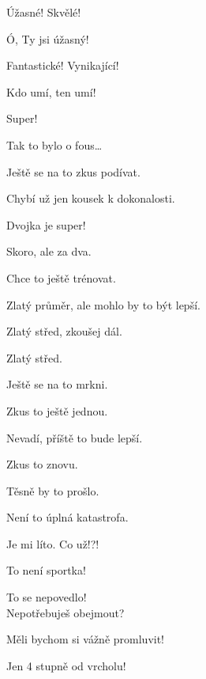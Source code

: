  Úžasné! Skvělé!

 Ó, Ty jsi úžasný!

 Fantastické! Vynikající! 

 Kdo umí, ten umí!

 Super!

 Tak to bylo o fous\dots

 Ještě se na to zkus podívat.

 Chybí už jen kousek k dokonalosti.

 Dvojka je super!

 Skoro, ale za dva.

 Chce to ještě trénovat.

 Zlatý průměr, ale mohlo by to být lepší.

 Zlatý střed, zkoušej dál.

 Zlatý střed.

 Ještě se na to mrkni.

 Zkus to ještě jednou.

 Nevadí, příště to bude lepší.

 Zkus to znovu.

 Těsně by to prošlo.

 Není to úplná katastrofa.

 Je mi líto.  Co už!?!

 To není sportka!

 To se nepovedlo!\\ Nepotřebuješ obejmout?

 Měli bychom si vážně promluvit!

 Jen 4 stupně od vrcholu!

